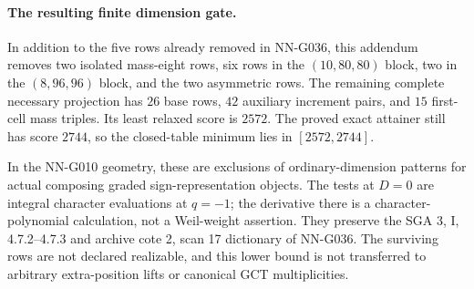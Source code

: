 \paragraph{The resulting finite dimension gate.}
In addition to the five rows already removed in
NN-G036, this addendum removes two isolated mass-eight
rows, six rows in the $(10,80,80)$ block, two in the
$(8,96,96)$ block, and the two asymmetric rows.
The remaining complete necessary projection has
$26$ base rows, $42$ auxiliary increment pairs,
and $15$ first-cell mass triples. Its least relaxed
score is $2572$. The proved exact attainer still
has score $2744$, so the closed-table minimum lies
in $[2572,2744]$.

In the NN-G010 geometry, these are exclusions of
ordinary-dimension patterns for actual composing
graded sign-representation objects. The tests at
$D=0$ are integral character evaluations at $q=-1$;
the derivative there is a character-polynomial
calculation, not a Weil-weight assertion.
They preserve the SGA 3, I, 4.7.2--4.7.3 and
archive cote 2, scan 17 dictionary of NN-G036.
The surviving rows are not declared realizable,
and this lower bound is not transferred to arbitrary
extra-position lifts or canonical GCT multiplicities.


